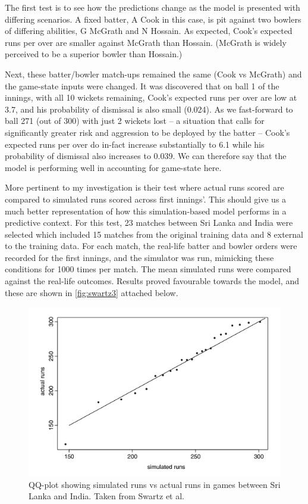 The first test is to see how the predictions change as the model is presented with differing scenarios. A fixed batter, A Cook in this case, is pit against two bowlers of differing abilities, G McGrath and N Hossain. As expected, Cook’s expected runs per over are smaller against McGrath than Hossain. (McGrath is widely perceived to be a superior bowler than Hossain.)

Next, these batter/bowler match-ups remained the same (Cook vs McGrath) and the game-state inputs were changed. It was discovered that on ball 1 of the innings, with all 10 wickets remaining, Cook’s expected runs per over are low at 3.7, and his probability of dismissal is also small (0.024). As we fast-forward to ball 271 (out of 300) with just 2 wickets lost – a situation that calls for significantly greater risk and aggression to be deployed by the batter – Cook’s expected runs per over do in-fact increase substantially to 6.1 while his probability of dismissal also increases to 0.039. We can therefore say that the model is performing well in accounting for game-state here.

More pertinent to my investigation is their test where actual runs scored are compared to simulated runs scored across first innings’. This should give us a much better representation of how this simulation-based model performs in a predictive context. For this test, 23 matches between Sri Lanka and India were selected which included 15 matches from the original training data and 8 external to the training data.  For each match, the real-life batter and bowler orders were recorded for the first innings, and the simulator was run, mimicking these conditions for 1000 times per match. The mean simulated runs were compared against the real-life outcomes. Results proved favourable towards the model, and these are shown in \autoref{fig:swartz3} attached below.

\begin{figure}[h]
    \centering
    \includegraphics{images/swartz3.png}
    \caption{QQ-plot showing simulated runs vs actual runs in games between Sri Lanka and India. Taken from Swartz et al.}
    \label{fig:swartz3}
\end{figure}

